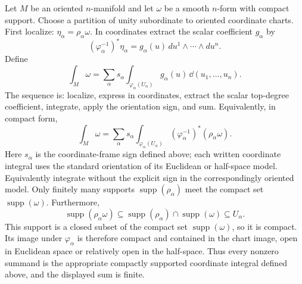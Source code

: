 \begin{definition}\label{def:manifold-integral}
Let $M$ be an oriented $n$-manifold and let $\omega$ be a smooth $n$-form
with compact support.  Choose a partition of unity subordinate to oriented
coordinate charts. First localize: $\eta_\alpha=\rho_\alpha\omega$.
In coordinates extract the scalar coefficient $g_\alpha$ by
\[
(\varphi_\alpha^{-1})^*\eta_\alpha
=g_\alpha(u)\,du^1\wedge\cdots\wedge du^n.
\]
Define
\[
\int_M\omega
=\sum_\alpha s_\alpha\int_{\varphi_\alpha(U_\alpha)}
g_\alpha(u)\,\dd(u_1,\ldots,u_n).
\]
The sequence is: localize, express in coordinates, extract the scalar
top-degree coefficient, integrate, apply the orientation sign, and sum.
Equivalently, in compact form,
\[
\int_M\omega
=
\sum_\alpha s_\alpha\int_{\varphi_\alpha(U_\alpha)}
(\varphi_\alpha^{-1})^*(\rho_\alpha\omega).
\]
Here $s_\alpha$ is the coordinate-frame sign defined above; each written
coordinate integral uses the standard orientation of its Euclidean or
half-space model. Equivalently integrate without the explicit sign in
the correspondingly oriented model. Only finitely many supports
\(\operatorname{supp}(\rho_\alpha)\) meet the
compact set \(\operatorname{supp}(\omega)\).  Furthermore,
\[
\operatorname{supp}(\rho_\alpha\omega)
\subseteq
\operatorname{supp}(\rho_\alpha)\cap\operatorname{supp}(\omega)
\subseteq U_\alpha.
\]
This support is a closed subset of the compact set
\(\operatorname{supp}(\omega)\), so it is compact.  Its image under
\(\varphi_\alpha\) is therefore compact and contained in the chart image, open in Euclidean
space or relatively open in the half-space. Thus every nonzero summand is
the appropriate compactly supported coordinate integral defined above, and the displayed sum is finite.
\end{definition}

